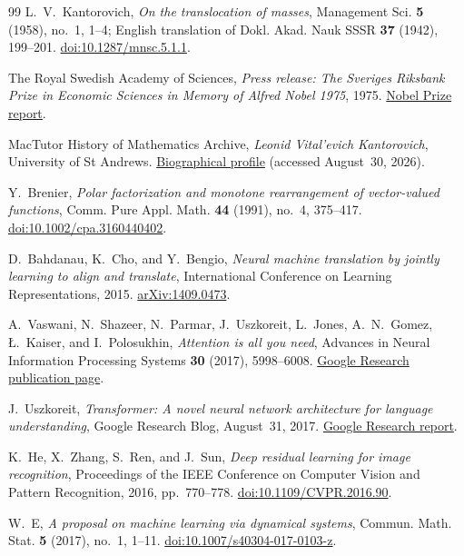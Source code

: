 \documentclass[11pt]{amsart}
\numberwithin{equation}{section}
\theoremstyle{plain}
\begin{document}
\begin{thebibliography}{99}
L.~V.~Kantorovich,
\emph{On the translocation of masses},
Management Sci. \textbf{5} (1958), no.~1, 1--4;
English translation of Dokl. Akad. Nauk SSSR \textbf{37} (1942), 199--201.
\href{https://doi.org/10.1287/mnsc.5.1.1}
{doi:10.1287/mnsc.5.1.1}.

The Royal Swedish Academy of Sciences,
\emph{Press release: The Sveriges Riksbank Prize in Economic Sciences in
Memory of Alfred Nobel 1975}, 1975.
\href{https://www.nobelprize.org/prizes/economic-sciences/1975/press-release/1000/}
{Nobel Prize report}.

MacTutor History of Mathematics Archive,
\emph{Leonid Vital'evich Kantorovich}, University of St Andrews.
\href{https://mathshistory.st-andrews.ac.uk/Biographies/Kantorovich/}
{Biographical profile} (accessed August~30, 2026).

Y.~Brenier,
\emph{Polar factorization and monotone rearrangement of vector-valued
functions},
Comm. Pure Appl. Math. \textbf{44} (1991), no.~4, 375--417.
\href{https://doi.org/10.1002/cpa.3160440402}
{doi:10.1002/cpa.3160440402}.

D.~Bahdanau, K.~Cho, and Y.~Bengio,
\emph{Neural machine translation by jointly learning to align and translate},
International Conference on Learning Representations, 2015.
\href{https://arxiv.org/abs/1409.0473}{arXiv:1409.0473}.

A.~Vaswani, N.~Shazeer, N.~Parmar, J.~Uszkoreit, L.~Jones, A.~N.~Gomez,
\L.~Kaiser, and I.~Polosukhin,
\emph{Attention is all you need},
Advances in Neural Information Processing Systems \textbf{30} (2017),
5998--6008.
\href{https://research.google/pubs/attention-is-all-you-need/}
{Google Research publication page}.

J.~Uszkoreit,
\emph{Transformer: A novel neural network architecture for language
understanding},
Google Research Blog, August~31, 2017.
\href{https://research.google/blog/transformer-a-novel-neural-network-architecture-for-language-understanding/}
{Google Research report}.

K.~He, X.~Zhang, S.~Ren, and J.~Sun,
\emph{Deep residual learning for image recognition},
Proceedings of the IEEE Conference on Computer Vision and Pattern Recognition,
2016, pp.~770--778.
\href{https://doi.org/10.1109/CVPR.2016.90}
{doi:10.1109/CVPR.2016.90}.

W.~E,
\emph{A proposal on machine learning via dynamical systems},
Commun. Math. Stat. \textbf{5} (2017), no.~1, 1--11.
\href{https://doi.org/10.1007/s40304-017-0103-z}
{doi:10.1007/s40304-017-0103-z}.


\end{thebibliography}
\end{document}
